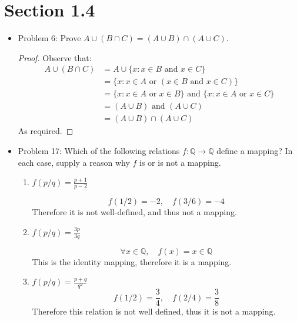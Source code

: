 \documentclass[a4paper,17pt]{extarticle}
\title{\scalebox{1.3}{Math 431 Homework 1}}
\author{\scalebox{1.4}{Theo Koss}}
\date{September 2022}
\theoremstyle{definition}
\renewcommand{\skip}{\par\null\par}
\newcommand{\Q}{\mathbb{Q}}
\begin{document}
\maketitle
\section{Section 1.4}
\begin{itemize}
    \item Problem 6: Prove $A\cup (B\cap C)=(A\cup B)\cap(A\cup C)$.
    \begin{proof}Observe that:
    \begin{align*}
        A\cup(B\cap C)&=A\cup\{x:x\in B\text{ and }x\in C\}\\
        &=\{x:x\in A\text{ or }(x\in B\text{ and }x\in C)\}\\
        &=\{x:x\in A\text{ or }x\in B\}\text{ and }\{x:x\in A\text{ or }x\in C\}\\
        &=(A\cup B)\text{ and }(A\cup C)\\
        &=(A\cup B)\cap(A\cup C)
        \end{align*}As required.
    \end{proof}
    \item Problem 17: Which of the following relations $f:\Q\to\Q$ define a mapping? In each case, supply a reason why $f$ is or is not a mapping.
    \begin{enumerate}[label=(\alph*)]
        \item $f(p/q)=\frac{p+1}{p-2}$\skip $$f(1/2)=-2,\quad f(3/6)=-4$$ Therefore it is not well-defined, and thus not a mapping.
        \item $f(p/q)=\frac{3p}{3q}$\skip $$\forall x\in\Q,\quad f(x)=x\in\Q$$ This is the identity mapping, therefore it is a mapping.
        \item $f(p/q)=\frac{p+q}{q^2}$ $$f(1/2)=\frac{3}{4},\quad f(2/4)=\frac{3}{8}$$ Therefore this relation is not well defined, thus it is not a mapping.
    \end{enumerate}
\end{itemize}
\end{document}
